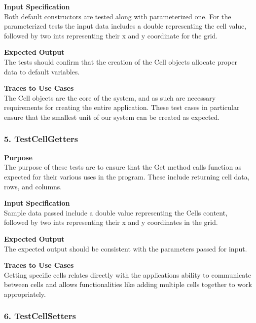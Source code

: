 \documentclass[12pt]{article}
\begin{document}
\noindent
{\bf Input Specification}\\
Both default constructors are tested along with parameterized one. For the parameterized tests the input data includes a double representing the cell value, followed by two ints representing their x and y coordinate for the grid. 

\noindent
{\bf Expected Output}\\
The tests should confirm that the creation of the Cell objects allocate proper data to default variables. 

\noindent
{\bf Traces to Use Cases}\\
The Cell objects are the core of the system, and as such are necessary requirements for creating the entire application. These test cases in particular ensure that the smallest unit of our system can be created as expected. 
\subsubsection{5. TestCellGetters} \label{tc:1}

\noindent
{\bf Purpose}\\
The purpose of these tests are to ensure that the Get method calls function as expected for their various uses in the program. These include returning cell data, rows, and columns.  

\noindent
{\bf Input Specification}\\
Sample data passed include a double value representing the Cells content, followed by two ints representing their x and y coordinates in the grid. 

\noindent
{\bf Expected Output}\\
The expected output should be consistent with the parameters passed for input. 

\noindent
{\bf Traces to Use Cases}\\
Getting specific cells relates directly with the applications ability to communicate between cells and allows functionalities like adding multiple cells together to work appropriately. 
\subsubsection{6. TestCellSetters} \label{tc:1}
\end{document}
